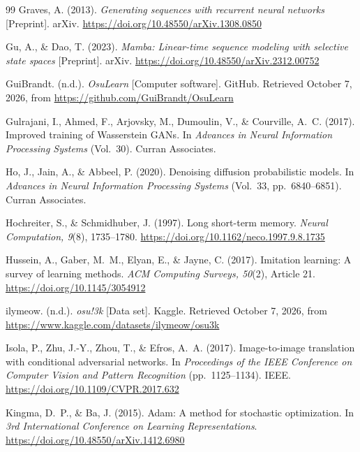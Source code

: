 \begin{thebibliography}{99}
Graves, A. (2013). \emph{Generating sequences with recurrent neural networks} [Preprint]. arXiv.
\url{https://doi.org/10.48550/arXiv.1308.0850}

Gu, A., \& Dao, T. (2023). \emph{Mamba: Linear-time sequence modeling with selective state spaces} [Preprint].
arXiv. \url{https://doi.org/10.48550/arXiv.2312.00752}

GuiBrandt. (n.d.). \emph{OsuLearn} [Computer software]. GitHub. Retrieved October 7, 2026, from
\url{https://github.com/GuiBrandt/OsuLearn}

Gulrajani, I., Ahmed, F., Arjovsky, M., Dumoulin, V., \& Courville, A.~C. (2017). Improved training of
Wasserstein GANs. In \emph{Advances in Neural Information Processing Systems} (Vol.~30). Curran Associates.

Ho, J., Jain, A., \& Abbeel, P. (2020). Denoising diffusion probabilistic models. In \emph{Advances in Neural
Information Processing Systems} (Vol.~33, pp.~6840--6851). Curran Associates.

Hochreiter, S., \& Schmidhuber, J. (1997). Long short-term memory. \emph{Neural Computation, 9}(8), 1735--1780.
\url{https://doi.org/10.1162/neco.1997.9.8.1735}

Hussein, A., Gaber, M.~M., Elyan, E., \& Jayne, C. (2017). Imitation learning: A survey of learning methods.
\emph{ACM Computing Surveys, 50}(2), Article 21. \url{https://doi.org/10.1145/3054912}

ilymeow. (n.d.). \emph{osu!3k} [Data set]. Kaggle. Retrieved October 7, 2026, from
\url{https://www.kaggle.com/datasets/ilymeow/osu3k}

Isola, P., Zhu, J.-Y., Zhou, T., \& Efros, A.~A. (2017). Image-to-image translation with conditional adversarial
networks. In \emph{Proceedings of the IEEE Conference on Computer Vision and Pattern Recognition}
(pp.~1125--1134). IEEE. \url{https://doi.org/10.1109/CVPR.2017.632}

Kingma, D.~P., \& Ba, J. (2015). Adam: A method for stochastic optimization. In \emph{3rd International
Conference on Learning Representations}. \url{https://doi.org/10.48550/arXiv.1412.6980}


\end{thebibliography}
